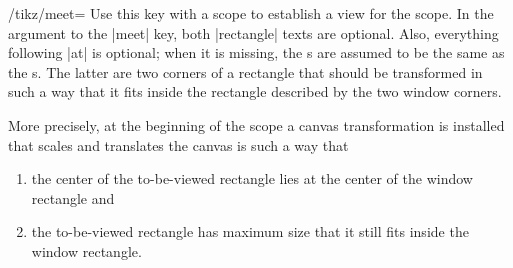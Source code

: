 \begin{key}{/tikz/meet=
}
    Use this key with a scope to establish a view for the scope. In the
    argument to the |meet| key, both |rectangle| texts are optional. Also,
    everything following |at| is optional; when it is missing, the s are assumed to be the same as the s. The
    latter are two corners of a rectangle that should be transformed in such a
    way that it fits inside the rectangle described by the two window corners.

    More precisely, at the beginning of the scope a canvas transformation is
    installed that scales and translates the canvas is such a way that
    \begin{enumerate}
        \item the center of the to-be-viewed rectangle lies at the center of
            the window rectangle and
        \item the to-be-viewed rectangle has maximum size that it still fits
            inside the window rectangle.
    \end{enumerate}
\begin{codeexample}[preamble={\usetikzlibrary{views}}]
\end{codeexample}
\begin{codeexample}[preamble={\usetikzlibrary{views}}]
\end{codeexample}


\end{key}
